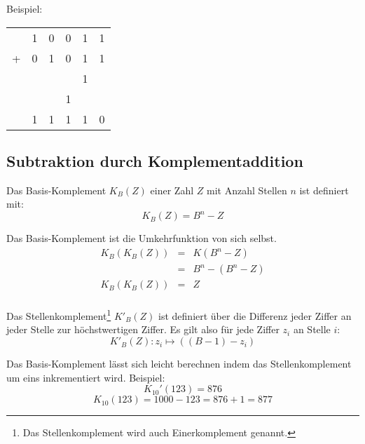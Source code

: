 Beispiel:

\begin{tabular}{lrrrrr}
  & 1 & 0 & 0 & 1 & 1 \\
+ & 0 & 1 & 0 & 1 & 1 \\
\hline
  &   &   &   & 1 &   \\
  &   &   & 1 &   &   \\
\hline
  & 1 & 1 & 1 & 1 & 0
\end{tabular}

\subsection{Subtraktion durch Komplementaddition}
Das Basis-Komplement $K_B(Z)$ einer Zahl $Z$ mit Anzahl Stellen $n$ ist definiert mit:
$$ K_B(Z) = B^n - Z$$

Das Basis-Komplement ist die Umkehrfunktion von sich selbst.
\begin{eqnarray*}
K_B(K_B(Z)) &=& K(B^n - Z) \\
&=& B^n - (B^n - Z) \\
K_B(K_B(Z)) &=& Z \\
\end{eqnarray*}

Das Stellenkomplement\footnote{Das Stellenkomplement wird auch Einerkomplement genannt.} $K'_B(Z)$ ist definiert über die Differenz jeder Ziffer an jeder Stelle zur höchstwertigen Ziffer. Es gilt also für jede Ziffer $z_i$ an Stelle $i$:
$$ K'_B(Z): z_i \mapsto ((B - 1) - z_i) $$

Das Basis-Komplement lässt sich leicht berechnen indem das Stellenkomplement um eins inkrementiert wird. Beispiel:
$$ K_{10}'(123) = 876 $$
$$ K_{10}(123) = 1000 - 123 = 876 + 1 = 877 $$

